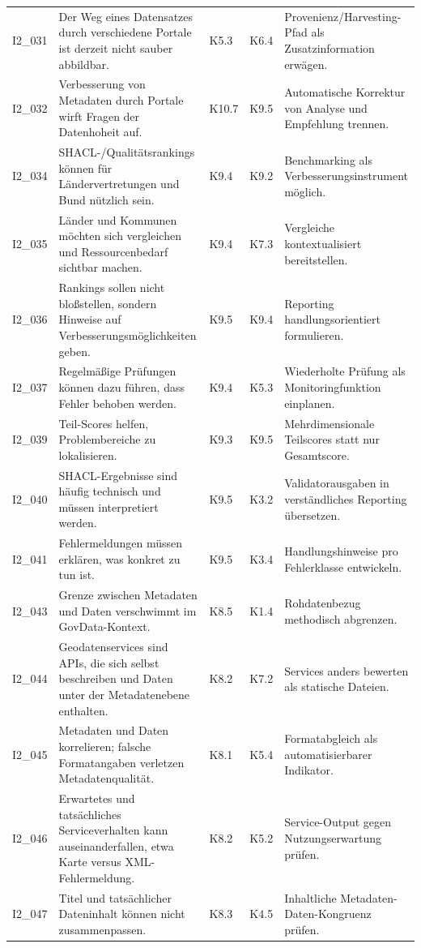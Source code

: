 \begin{longtable}{p{0.9cm} p{6cm} p{0.9cm} p{0.9cm} p{6cm}}
I2\_031 & Der Weg eines Datensatzes durch verschiedene Portale ist derzeit nicht sauber abbildbar. & K5.3 & K6.4 & Provenienz/Harvesting-Pfad als Zusatzinformation erwägen. \\
I2\_032 & Verbesserung von Metadaten durch Portale wirft Fragen der Datenhoheit auf. & K10.7 & K9.5 & Automatische Korrektur von Analyse und Empfehlung trennen. \\
I2\_034 & SHACL-/Qualitätsrankings können für Ländervertretungen und Bund nützlich sein. & K9.4 & K9.2 & Benchmarking als Verbesserungsinstrument möglich. \\
I2\_035 & Länder und Kommunen möchten sich vergleichen und Ressourcenbedarf sichtbar machen. & K9.4 & K7.3 & Vergleiche kontextualisiert bereitstellen. \\
I2\_036 & Rankings sollen nicht bloßstellen, sondern Hinweise auf Verbesserungsmöglichkeiten geben. & K9.5 & K9.4 & Reporting handlungsorientiert formulieren. \\
I2\_037 & Regelmäßige Prüfungen können dazu führen, dass Fehler behoben werden. & K9.4 & K5.3 & Wiederholte Prüfung als Monitoringfunktion einplanen. \\
I2\_039 & Teil-Scores helfen, Problembereiche zu lokalisieren. & K9.3 & K9.5 & Mehrdimensionale Teilscores statt nur Gesamtscore. \\
I2\_040 & SHACL-Ergebnisse sind häufig technisch und müssen interpretiert werden. & K9.5 & K3.2 & Validatorausgaben in verständliches Reporting übersetzen. \\
I2\_041 & Fehlermeldungen müssen erklären, was konkret zu tun ist. & K9.5 & K3.4 & Handlungshinweise pro Fehlerklasse entwickeln. \\
I2\_043 & Grenze zwischen Metadaten und Daten verschwimmt im GovData-Kontext. & K8.5 & K1.4 & Rohdatenbezug methodisch abgrenzen. \\
I2\_044 & Geodatenservices sind APIs, die sich selbst beschreiben und Daten unter der Metadatenebene enthalten. & K8.2 & K7.2 & Services anders bewerten als statische Dateien. \\
I2\_045 & Metadaten und Daten korrelieren; falsche Formatangaben verletzen Metadatenqualität. & K8.1 & K5.4 & Formatabgleich als automatisierbarer Indikator. \\
I2\_046 & Erwartetes und tatsächliches Serviceverhalten kann auseinanderfallen, etwa Karte versus XML-Fehlermeldung. & K8.2 & K5.2 & Service-Output gegen Nutzungserwartung prüfen. \\
I2\_047 & Titel und tatsächlicher Dateninhalt können nicht zusammenpassen. & K8.3 & K4.5 & Inhaltliche Metadaten-Daten-Kongruenz prüfen. \\

\end{longtable}
